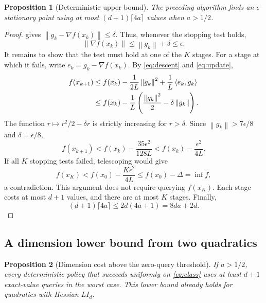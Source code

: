 \documentclass[11pt]{article}
\numberwithin{equation}{section}
\newtheorem{proposition}[proposition]{Proposition}
\theoremstyle{definition}
\theoremstyle{remark}
\newcommand{\norm}[1]{\left\lVert #1\right\rVert}
\newcommand{\ip}[2]{\left\langle #1,#2\right\rangle}
\begin{document}
\begin{proposition}[Deterministic upper bound]
\label{prop:upper}
The preceding algorithm finds an $\epsilon$-stationary point using at most
$(d+1)\lceil4a\rceil$ values when $a>1/2$.
\end{proposition}

\begin{proof}
 gives $\norm{g_k-\nabla f(x_k)}\leq\delta$.
Thus, whenever the stopping test holds,
\[
    \norm{\nabla f(x_k)}\leq\norm{g_k}+\delta\leq\epsilon.
\]
It remains to show that the test must hold at one of the $K$ stages.
For a stage at which it fails, write $e_k=g_k-\nabla f(x_k)$.
By \eqref{eq:descent} and \eqref{eq:update},
\begin{align}
 f(x_{k+1})
 &\leq f(x_k)-\frac{1}{2L}\norm{g_k}^2
                    +\frac{1}{L}\ip{e_k}{g_k}\notag\\
 &\leq f(x_k)-\frac1L\left(\frac{\norm{g_k}^2}{2}
                                    -\delta\norm{g_k}\right).
 \label{eq:inexact}
\end{align}
The function $r\mapsto r^2/2-\delta r$ is strictly increasing for $r>\delta$.
Since $\norm{g_k}>7\epsilon/8$ and $\delta=\epsilon/8$,
\begin{equation}
    f(x_{k+1})<f(x_k)-\frac{35\epsilon^2}{128L}
                    <f(x_k)-\frac{\epsilon^2}{4L}.
    \label{eq:successful-descent}
\end{equation}
If all $K$ stopping tests failed, telescoping would give
\[
    f(x_K)<f(x_0)-\frac{K\epsilon^2}{4L}
           \leq f(x_0)-\Delta=\inf f,
\]
a contradiction. This argument does not require querying $f(x_K)$.
Each stage costs at most $d+1$ values, and there are at most $K$ stages.
Finally,
\[
    (d+1)\lceil4a\rceil\leq2d(4a+1)=8da+2d.
\]
\end{proof}

\subsection{A dimension lower bound from two quadratics}

\begin{proposition}[Dimension cost above the zero-query threshold]
\label{prop:quadratic}
If $a>1/2$, every deterministic policy that succeeds uniformly on
\eqref{eq:class} uses at least $d+1$ exact-value queries in the worst case.
This lower bound already holds for quadratics with Hessian $LI_d$.
\end{proposition}
\end{document}
